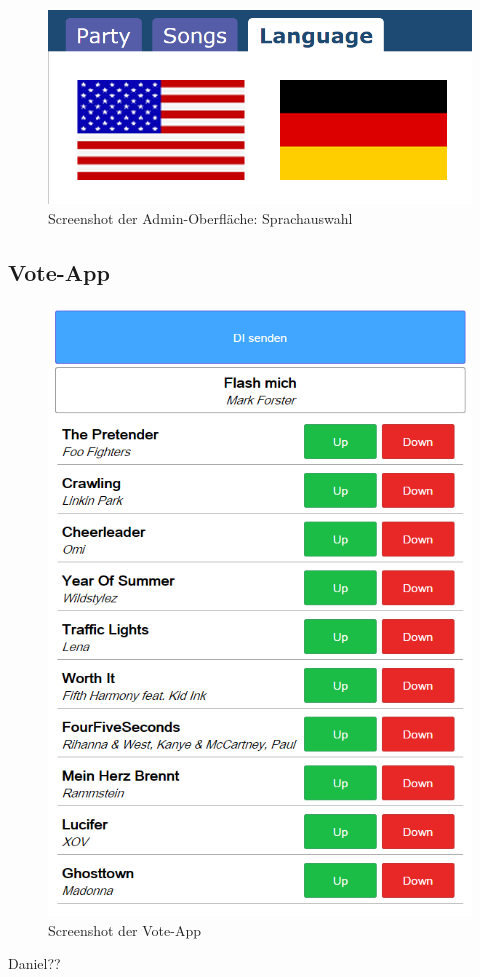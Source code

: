 \begin{figure}[tbh]
\centering
\includegraphics[width=0.7\linewidth]{Bilder/Screenshot-Admin-Language}
\caption{Screenshot der Admin-Oberfläche: Sprachauswahl}
\label{fig:Screenshot-Admin-Language}
\end{figure}


\subsection{Vote-App}

\begin{figure}[tbh]
\centering
\includegraphics[width=0.7\linewidth]{Bilder/Screenshot-Vote-App}
\caption{Screenshot der Vote-App}
\label{fig:Screenshot-Vote-App}
\end{figure}


Daniel??